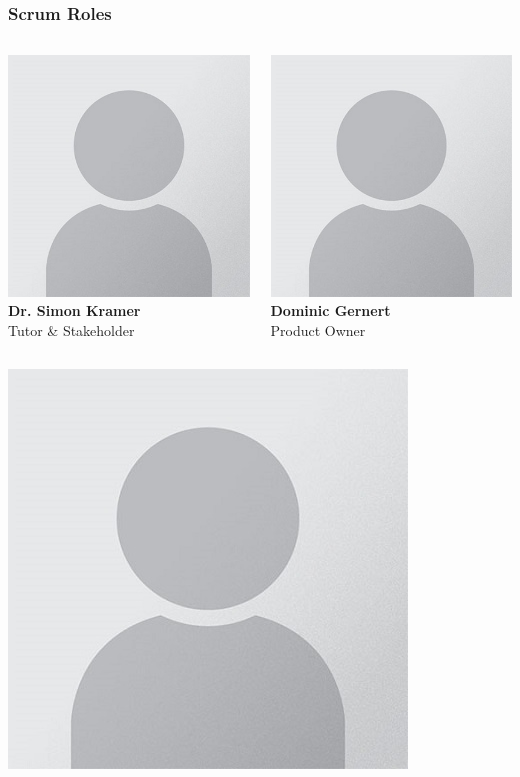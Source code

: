 \begin{frame}
    \frametitle{Scrum Roles}
    \begin{columns}
        \centering
        \includegraphics[width=0.45\linewidth]{../assets/avatar_placeholder.jpg} \\
        \textbf{Dr. Simon Kramer} \\ \small{Tutor \& Stakeholder} \par\vspace{0.5cm}
        \centering
        \includegraphics[width=0.45\linewidth]{../assets/avatar_placeholder.jpg} \\
        \textbf{Dominic Gernert} \\ \small{Product Owner} \par\vspace{0.5cm}
    \end{columns}
    \begin{columns}
        \centering
        \includegraphics[width=0.45\linewidth]{../assets/avatar_placeholder.jpg} \\

\end{columns}
\end{frame}
